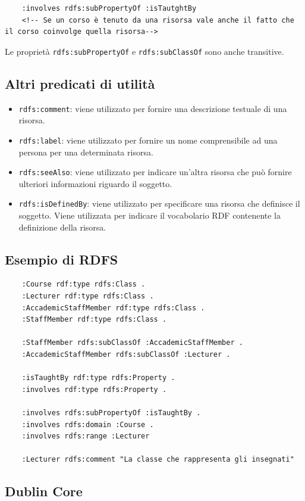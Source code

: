 \begin{lstlisting}
	:involves rdfs:subPropertyOf :isTautghtBy
	<!-- Se un corso è tenuto da una risorsa vale anche il fatto che il corso coinvolge quella risorsa-->
\end{lstlisting}

Le proprietà \texttt{rdfs:subPropertyOf} e \texttt{rdfs:subClassOf} sono anche transitive.

\subsection{Altri predicati di utilità}

\begin{itemize}
	\item \texttt{rdfs:comment}: viene utilizzato per fornire una descrizione testuale di una risorsa.
	\item \texttt{rdfs:label}: viene utilizzato per fornire un nome comprensibile ad una persona per una determinata risorsa.
	\item \texttt{rdfs:seeAlso}: viene utilizzato per indicare un'altra risorsa che può fornire ulteriori informazioni riguardo il soggetto.
	\item \texttt{rdfs:isDefinedBy}: viene utilizzato per specificare una risorsa che definisce il soggetto. Viene utilizzata per indicare il vocabolario RDF contenente la definizione della risorsa.
\end{itemize}

\subsection{Esempio di RDFS}

\begin{lstlisting}
	:Course rdf:type rdfs:Class .
	:Lecturer rdf:type rdfs:Class .
	:AccademicStaffMember rdf:type rdfs:Class .
	:StaffMember rdf:type rdfs:Class .
	
	:StaffMember rdfs:subClassOf :AccademicStaffMember .
	:AccademicStaffMember rdfs:subClassOf :Lecturer .
	
	:isTaughtBy rdf:type rdfs:Property .
	:involves rdf:type rdfs:Property .
	
	:involves rdfs:subPropertyOf :isTaughtBy .
	:involves rdfs:domain :Course .
	:involves rdfs:range :Lecturer
	
	:Lecturer rdfs:comment "La classe che rappresenta gli insegnati"
\end{lstlisting}

\subsection{Dublin Core}


